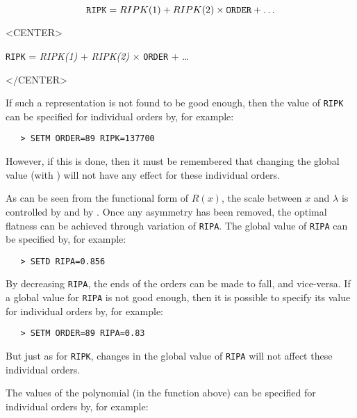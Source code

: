 \begin{latexonly}
\begin{displaymath}
{\tt RIPK} = RIPK(1) + RIPK(2) \times {\tt ORDER} +\ldots
\end{displaymath}
\end{latexonly}

\begin{htmlonly}
\begin{rawhtml}
<CENTER>
\end{rawhtml}
{\tt RIPK} = {\it RIPK(1)} + {\it RIPK(2)} $\times$ {\tt ORDER} + \ldots
\begin{rawhtml}
</CENTER>
\end{rawhtml}
\end{htmlonly}

If such a representation is not found to be good enough, then the value of
\verb+RIPK+ can be specified for individual orders by, for example:

\begin{verbatim}
   > SETM ORDER=89 RIPK=137700
\end{verbatim}

However, if this is done, then it must be remembered that changing the global
value (with ) will not have any effect for these
individual orders.

As can be seen from the functional form of $R(x)$, the scale between $x$
and $\lambda$ is controlled by 
 and by \@.  Once any
asymmetry has been removed, the optimal flatness can be achieved through
variation of \verb+RIPA+\@.  The global value of \verb+RIPA+ can be specified
by, for example:

\begin{verbatim}
   > SETD RIPA=0.856
\end{verbatim}

By decreasing \verb+RIPA+, the ends of the orders can be made to fall, and
vice-versa.  If a global value for \verb+RIPA+ is not good enough, then it is
possible to specify its value for individual orders by, for example:

\begin{verbatim}
   > SETM ORDER=89 RIPA=0.83
\end{verbatim}

But just as for \verb+RIPK+, changes in the global value of \verb+RIPA+ will
not affect these individual orders.

The values of the 
 polynomial (in the function above) can be
specified for individual orders by, for example:

